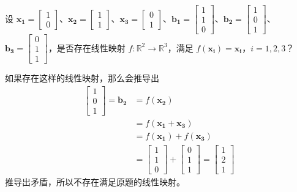 	\begin{exercise}[1.1.8]
		设 $\mathbf{x_1}=\begin{bmatrix}
			1\\0
		\end{bmatrix}$、$\mathbf{x_2}=\begin{bmatrix}
			1\\1
		\end{bmatrix}$、$\mathbf{x_3}=\begin{bmatrix}
			0\\1
		\end{bmatrix}$、$\mathbf{b_1}=\begin{bmatrix}
			1\\1\\0
		\end{bmatrix}$、$\mathbf{b_2}=\begin{bmatrix}
			1\\0\\1
		\end{bmatrix}$、$\mathbf{b_3}=\begin{bmatrix}
			0\\1\\1
		\end{bmatrix}$，是否存在线性映射 $f: \mathbb{R}^2\rightarrow\mathbb{R}^3$，满足 $f(\mathbf{x_i})=\mathbf{x_i}$，$i=1,2,3$？
	\end{exercise}
	\begin{solution}
		如果存在这样的线性映射，那么会推导出
		\begin{align*}
			\begin{bmatrix}
				1\\0\\1
			\end{bmatrix}=\mathbf{b_2}&=f(\mathbf{x_2})\\
			&=f(\mathbf{x_1}+\mathbf{x_3})\\
			&=f(\mathbf{x_1})+f(\mathbf{x_3})\\
			&=\begin{bmatrix}
				1\\1\\0
			\end{bmatrix}+\begin{bmatrix}
				0\\1\\1
			\end{bmatrix}=\begin{bmatrix}
				1\\2\\1
			\end{bmatrix}
		\end{align*}
		推导出矛盾，所以不存在满足原题的线性映射。
	\end{solution}
\


